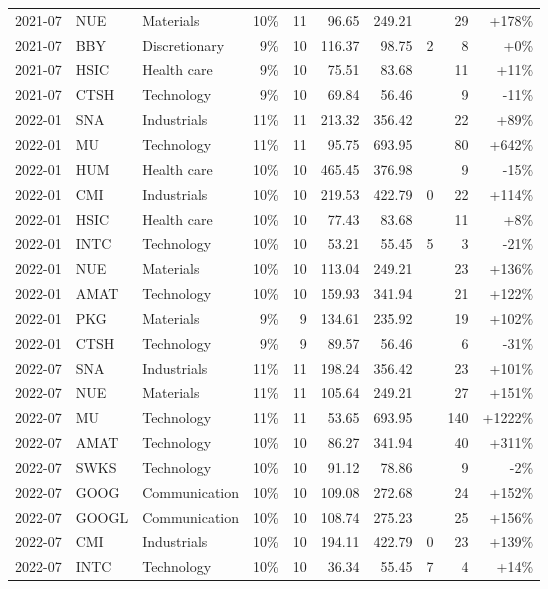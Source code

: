 \documentclass[11pt,a4paper]{article}
\begin{document}
{\begin{longtable}{l l l r r r r r r r}
2021-07 & NUE & Materials & 10\% & 11 & 96.65 & 249.21 &  & 29 & +178\% \\
2021-07 & BBY & Discretionary & 9\% & 10 & 116.37 & 98.75 & 2 & 8 & +0\% \\
2021-07 & HSIC & Health care & 9\% & 10 & 75.51 & 83.68 &  & 11 & +11\% \\
2021-07 & CTSH & Technology & 9\% & 10 & 69.84 & 56.46 &  & 9 & -11\% \\
2022-01 & SNA & Industrials & 11\% & 11 & 213.32 & 356.42 &  & 22 & +89\% \\
2022-01 & MU & Technology & 11\% & 11 & 95.75 & 693.95 &  & 80 & +642\% \\
2022-01 & HUM & Health care & 10\% & 10 & 465.45 & 376.98 &  & 9 & -15\% \\
2022-01 & CMI & Industrials & 10\% & 10 & 219.53 & 422.79 & 0 & 22 & +114\% \\
2022-01 & HSIC & Health care & 10\% & 10 & 77.43 & 83.68 &  & 11 & +8\% \\
2022-01 & INTC & Technology & 10\% & 10 & 53.21 & 55.45 & 5 & 3 & -21\% \\
2022-01 & NUE & Materials & 10\% & 10 & 113.04 & 249.21 &  & 23 & +136\% \\
2022-01 & AMAT & Technology & 10\% & 10 & 159.93 & 341.94 &  & 21 & +122\% \\
2022-01 & PKG & Materials & 9\% & 9 & 134.61 & 235.92 &  & 19 & +102\% \\
2022-01 & CTSH & Technology & 9\% & 9 & 89.57 & 56.46 &  & 6 & -31\% \\
2022-07 & SNA & Industrials & 11\% & 11 & 198.24 & 356.42 &  & 23 & +101\% \\
2022-07 & NUE & Materials & 11\% & 11 & 105.64 & 249.21 &  & 27 & +151\% \\
2022-07 & MU & Technology & 11\% & 11 & 53.65 & 693.95 &  & 140 & +1222\% \\
2022-07 & AMAT & Technology & 10\% & 10 & 86.27 & 341.94 &  & 40 & +311\% \\
2022-07 & SWKS & Technology & 10\% & 10 & 91.12 & 78.86 &  & 9 & -2\% \\
2022-07 & GOOG & Communication & 10\% & 10 & 109.08 & 272.68 &  & 24 & +152\% \\
2022-07 & GOOGL & Communication & 10\% & 10 & 108.74 & 275.23 &  & 25 & +156\% \\
2022-07 & CMI & Industrials & 10\% & 10 & 194.11 & 422.79 & 0 & 23 & +139\% \\
2022-07 & INTC & Technology & 10\% & 10 & 36.34 & 55.45 & 7 & 4 & +14\% \\

\end{longtable}}
\end{document}

